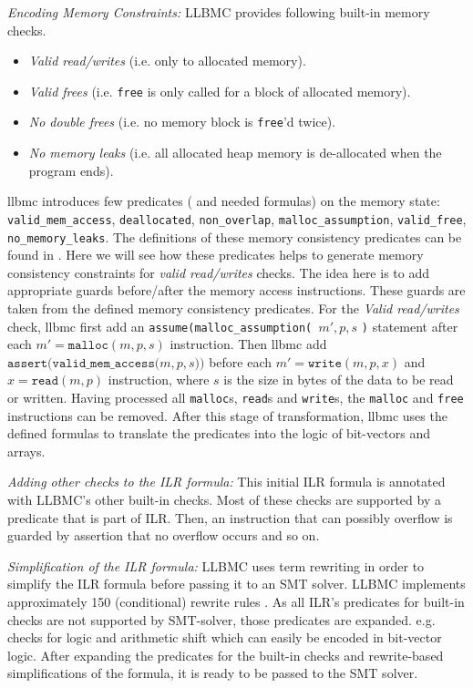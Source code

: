 \documentclass[14pt]{article}
\begin{document}
\par \textit{Encoding Memory Constraints:} LLBMC provides following built-in memory checks. 
\begin{itemize}
  \item \textit{Valid read/writes } (i.e. only to allocated memory).
  \item \textit{Valid frees} (i.e. \texttt{free} is only called for a block of allocated memory).
  \item \textit{No double frees} (i.e. no memory block is  \texttt{free}'d twice).
  \item \textit{No memory leaks} (i.e. all allocated heap memory is de-allocated when the program ends).
\end{itemize}
llbmc introduces few predicates ( and needed formulas) on the memory state: 
  \texttt{valid\_mem\_access},
  \texttt{deallocated},
  \texttt{non\_overlap},
  \texttt{malloc\_assumption},
  \texttt{valid\_free},
  \texttt{no\_memory\_leaks}. The definitions of these memory consistency predicates can be found in \cite{llbmc2}. Here we will see how these predicates helps to generate memory consistency constraints for \textit{valid read/writes } checks. The idea here is to add appropriate guards before/after the memory access instructions. These guards are taken from the defined memory consistency predicates. For the \textit{Valid read/writes } check, llbmc first add an \texttt{assume(malloc\_assumption( }\(m', p, s\) \texttt{)} statement after each \(m' = \texttt{malloc}(m, p, s)\) instruction. Then llbmc add \(\texttt{assert(valid\_mem\_access(}m, p, s\texttt{))}\) before each \( m' = \texttt{write}(m, p, x)\) and \( x = \texttt{read}(m, p)\) instruction, where  \(s\) is the size in bytes of the data to be read or written. Having processed all \texttt{malloc}s, \texttt{read}s and \texttt{write}s, the \texttt{malloc} and \texttt{free} instructions can be removed. After this stage of transformation, llbmc uses the defined formulas to translate the predicates into the logic of bit-vectors and arrays.
  
 \par \textit{Adding other checks to the ILR formula:} This initial ILR formula is annotated with LLBMC's other built-in checks. Most of these checks are supported by a predicate that is part of ILR. Then, an instruction that can possibly overflow is guarded by assertion that no overflow occurs and so on. 
 
 \par \textit{Simplification of the ILR formula:} LLBMC uses term rewriting in order to simplify the ILR formula before passing it to an SMT solver. LLBMC implements  approximately 150 (conditional) rewrite rules \cite{llbmc0}. As all ILR's predicates for built-in checks are not supported by SMT-solver, those predicates are expanded. e.g. checks for logic and arithmetic shift which can easily be encoded in bit-vector logic. After expanding the predicates for the built-in checks and rewrite-based simplifications of the formula, it is ready to be passed to the SMT solver.
  
\end{document}
